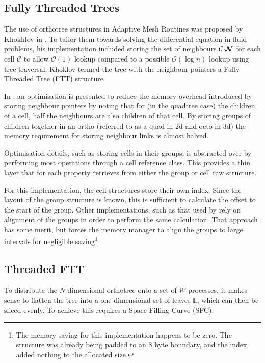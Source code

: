 \documentclass{IIBproject}
\newcommand{\vect} [1] {\bm{#1}}
\newcommand{\acc}{{\mkern 0.5mu\cdot\mkern 0.5mu}}
\newcommand{\bigO} [1]{\mathcal{O}(#1)}
\numberwithin{figure}{section}
\begin{document}
\subsection{Fully Threaded Trees}

The use of orthotree structures in Adaptive Mesh Routines was proposed by Khokhlov in \cite{Khokhlov98} . To tailor them towards solving the differential equation in fluid problems, his implementation included storing the set of neighbours $\mathcal{C}\acc\vect{\mathcal{N}}$ for each cell $\mathcal{C}$ to allow $\bigO{1}$ lookup compared to a possible $\bigO{\log n}$ lookup using tree traversal. Khoklov termed the tree with the neighbour pointers a Fully Threaded Tree (FTT) structure.

In \cite{Khokhlov98}, an optimisation is presented to reduce the memory overhead introduced by storing neighbour pointers by noting that for (in the quadtree case) the children of a cell, half the neighbours are also children of that cell. By storing groups of children together in an ortho (referred to as a quad in 2d and octo in 3d) the memory requirement for storing neighbour links is almost halved.

Optimisation details, such as storing cells in their groups, is abstracted over by performing most operations through a cell reference class. This provides a thin layer that for each property retrieves from either the group or cell raw structure. 

For this implementation, the cell structures store their own index. Since the layout of the group structure is known, this is sufficient to calculate the offset to the start of the group. Other implementations, such as that used by \cite{Yung2010} rely on alignment of the groups in order to perform the same calculation. That approach has some merit, but forces the memory manager to align the groups to large intervals for negligible saving\footnote{The memory saving for this implementation happens to be zero. The structure was already being padded to an 8 byte boundary, and the index added nothing to the allocated size. } .


\subsection{Threaded FTT}

To distribute the $N$ dimensional orthotree onto a set of $W$ processes, it makes sense to flatten the tree into a one dimensional set of leaves $\mathbb{L}$, which can then be sliced evenly. To achieve this requires a Space Filling Curve (SFC). 
\end{document}
